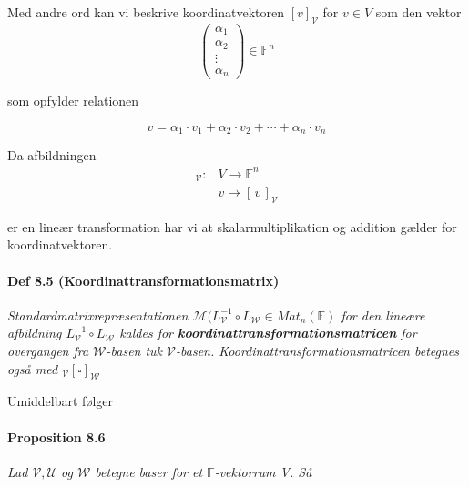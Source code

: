 \documentclass[paper=a4, fontsize=11pt]{scrartcl} %
\begin{document}
	Med andre ord kan vi beskrive koordinatvektoren $[v]_{\mathcal{V}}$ for $v \in V$ som den vektor
	\[\begin{pmatrix}
	\alpha_1 \\
	\alpha_2 \\
	\vdots \\
	\alpha_n
	\end{pmatrix} \in \mathbb{F}^n \tag{8.8}
	\]
	
	som opfylder relationen
	
	\[v = \alpha_1 \cdot v_1 + \alpha_2 \cdot v_2 + \cdots + \alpha_n \cdot v_n \tag{8.9}\] 
	
	Da afbildningen
	\begin{align*}
		[\,\cdot\,]_{\mathcal{V}} : &V \rightarrow \mathbb{F}^n\\
		& v \mapsto [\,v\,]_{\mathcal{V}}
	\end{align*}
	
	er en lineær transformation har vi at skalarmultiplikation og addition gælder for koordinatvektoren.
	
	\paragraph{Def 8.5 (Koordinattransformationsmatrix)}
	
	\textit{Standardmatrixrepræsentationen $\mathcal{M}(L_{\mathcal{V}}^{-1} \circ L_{\mathcal{W}} \in Mat_n(\mathbb{F})$ for den lineære afbildning $L_{\mathcal{V}}^{-1} \circ L_{\mathcal{W}}$ kaldes for \textbf{koordinattransformationsmatricen} for overgangen fra $\mathcal{W}$-basen tuk $\mathcal{V}$-basen. Koordinattransformationsmatricen betegnes også med $_\mathcal{V}[{\scriptstyle\square}]_{\mathcal{W}}$}
	
	Umiddelbart følger
	
	\paragraph{Proposition 8.6} \textit{Lad $\mathcal{V}, \mathcal{U}$ og $\mathcal{W}$ betegne baser for et $\mathbb{F}$-vektorrum V. Så}
	
\end{document}
